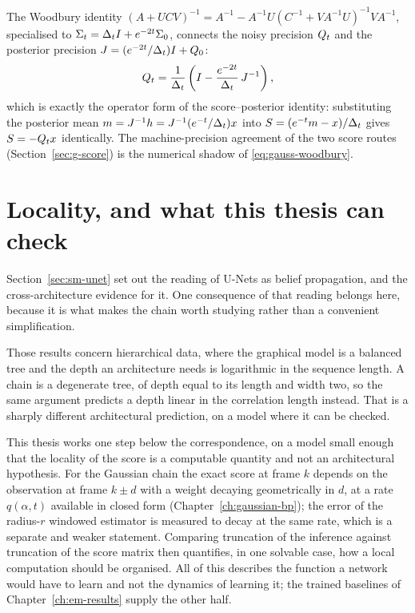 The Woodbury identity
$(A + UCV)^{-1} = A^{-1} - A^{-1}U (C^{-1} + V A^{-1} U)^{-1} V A^{-1}$,
specialised to $\Sigma_t = \Delta_t I + e^{-2t} \Sigma_0$, connects the noisy
precision $Q_t$ and the posterior precision
$J = (e^{-2t}/\Delta_t) I + Q_0$:
\begin{equation}
  Q_t
  = \frac{1}{\Delta_t}
    \left( I - \frac{e^{-2t}}{\Delta_t}\, J^{-1} \right),
  \label{eq:gauss-woodbury}
\end{equation}
which is exactly the operator form of the score--posterior identity: substituting the
posterior mean $m = J^{-1} h = J^{-1} (e^{-t}/\Delta_t) x$ into
$S = (e^{-t} m - x)/\Delta_t$ gives $S = -Q_t x$ identically. The
machine-precision agreement of the two score routes
(Section~\ref{sec:g-score}) is the numerical shadow of
\eqref{eq:gauss-woodbury}.

\section{Locality, and what this thesis can check}\label{sec:cnn-locality}

Section~\ref{sec:sm-unet} set out the reading of U-Nets as belief propagation,
and the cross-architecture evidence for it. One consequence of that reading
belongs here, because it is what makes the chain worth studying rather than a
convenient simplification.

Those results concern hierarchical data, where the graphical model is a
balanced tree and the depth an architecture needs is logarithmic in the
sequence length. A chain is a degenerate tree, of depth equal to its length and
width two, so the same argument predicts a depth linear in the correlation
length instead. That is a sharply different architectural prediction, on a model
where it can be checked.

This thesis works one step below the correspondence, on a model small enough
that the locality of the score is a computable quantity and not an
architectural hypothesis. For the Gaussian chain the exact score at frame $k$
depends on the observation at frame $k \pm d$ with a weight decaying
geometrically in $d$, at a rate $q(\alpha,t)$ available in closed form
(Chapter~\ref{ch:gaussian-bp}); the error of the radius-$r$ windowed estimator
is measured to decay at the same rate, which is a separate and weaker
statement. Comparing truncation of the inference against truncation of the
score matrix then quantifies, in one solvable case, how a local computation
should be organised. All of this describes the function a network would have to
learn and not the dynamics of learning it; the trained baselines of
Chapter~\ref{ch:em-results} supply the other half.
